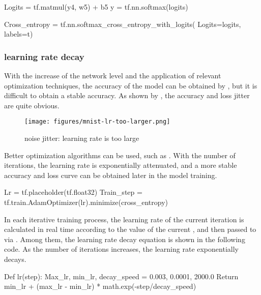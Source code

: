 \begin{content}
\begin{content}
\begin{leftbar}
\begin{python}
Logits = tf.matmul(y4, w5) + b5
y = tf.nn.softmax(logits)

Cross_entropy = tf.nn.softmax_cross_entropy_with_logits(
  Logits=logits, labels=t)
\end{python}
\end{leftbar}

\subsubsection{learning rate decay}

With the increase of the network level and the application of relevant optimization techniques, the accuracy of the model can be obtained by , but it is difficult to obtain a stable accuracy. As shown by , the accuracy and loss jitter are quite obvious.

\begin{figure}[H]
\centering
\texttt{[image: figures/mnist-lr-too-larger.png]}
\caption{noise jitter: learning rate is too large}
 \label{fig:mnist-lr-too-larger}
\end{figure}

Better optimization algorithms can be used, such as . With the number of iterations, the learning rate is exponentially attenuated, and a more stable accuracy and loss curve can be obtained later in the model training.

\begin{leftbar}
\begin{python}
Lr = tf.placeholder(tf.float32)
Train_step = tf.train.AdamOptimizer(lr).minimize(cross_entropy)
\end{python}
\end{leftbar}

In each iterative training process, the learning rate of the current iteration  is calculated in real time according to the value of the current , and then passed to  via  . Among them, the learning rate decay equation is shown in the following code. As the number of iterations increases, the learning rate exponentially decays.

\begin{leftbar}
\begin{python}
Def lr(step):
  Max_lr, min_lr, decay_speed = 0.003, 0.0001, 2000.0
  Return min_lr + (max_lr - min_lr) * math.exp(-step/decay_speed)


\end{python}
\end{leftbar}
\end{content}
\end{content}
